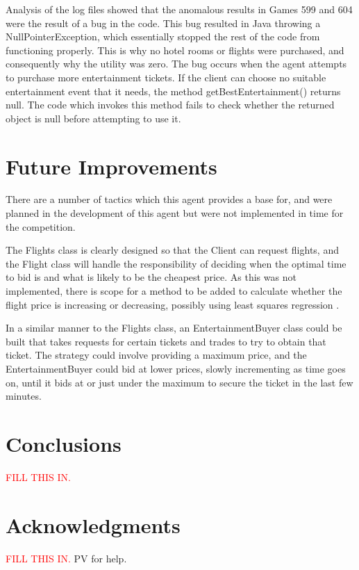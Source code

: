 \documentclass{acm_proc_article-sp}
\begin{document}
 Analysis of the log files showed that the anomalous results in Games 599 and 604 were the result of a bug in the code.  This bug resulted in Java throwing a NullPointerException, which essentially stopped the rest of the code from functioning properly.  This is why no hotel rooms or flights were purchased, and consequently why the utility was zero.  The bug occurs when the agent attempts to purchase more entertainment tickets.  If the client can choose no suitable entertainment event that it needs, the method getBestEntertainment() returns null.  The code which invokes this method fails to check whether the returned object is null before attempting to use it.
 
\section{Future Improvements}
 \label{future}
 There are a number of tactics which this agent provides a base for, and were planned in the development of this agent but were not implemented in time for the competition.
 
 The Flights class is clearly designed so that the Client can request flights, and the Flight class will handle the responsibility of deciding when the optimal time to bid is and what is likely to be the cheapest price.  As this was not implemented, there is scope for a method to be added to calculate whether the flight price is increasing or decreasing, possibly using least squares regression \cite{Vytelingum2007}.
 
 In a similar manner to the Flights class, an EntertainmentBuyer class could be built that takes requests for certain tickets and trades to try to obtain that ticket.  The strategy could involve providing a maximum price, and the EntertainmentBuyer could bid at lower prices, slowly incrementing as time goes on, until it bids at or just under the maximum to secure the ticket in the last few minutes.  

\section{Conclusions}
 \label{conc}
 \textcolor{red}{FILL THIS IN.}

\section{Acknowledgments}
 \textcolor{red}{FILL THIS IN.}
PV for help.

%

%
%
\balancecolumns
\end{document}
